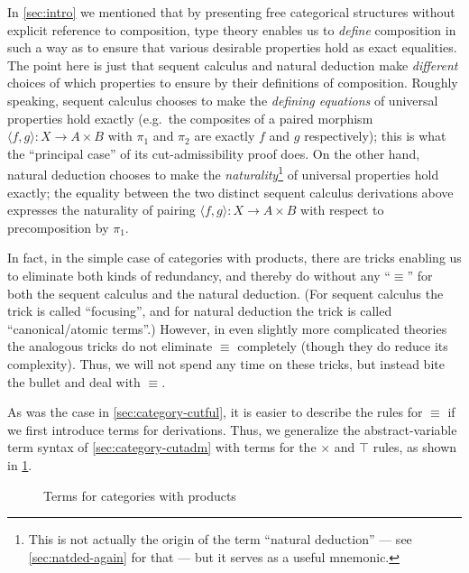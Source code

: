 \documentclass{book}
\def\idfunc{\mathsf{id}}
\let\types\vdash
\def\type{\;\ftype}
\def\unit{\top}%
\def\ttt{\mathord{\ast}}%
\def\timesE{\ensuremath{\mathord{\times}E}}
\def\timesI{\ensuremath{\mathord{\times}I}}
\def\pair#1#2{\langle #1,#2\rangle}
\def\pr#1#2#3{\pi_{#1}^{#2,#3}}
\begin{document}
\begin{rmk}
  In \cref{sec:intro} we mentioned that by presenting free categorical structures without explicit reference to composition, type theory enables us to \emph{define} composition in such a way as to ensure that various desirable properties hold as exact equalities.
  The point here is just that sequent calculus and natural deduction make \emph{different} choices of which properties to ensure by their definitions of composition.
  Roughly speaking, sequent calculus chooses to make the \emph{defining equations} of universal properties hold exactly (e.g.\ the composites of a paired morphism $\pair f g : X \to A\times B$ with $\pi_1$ and $\pi_2$ are exactly $f$ and $g$ respectively); this is what the ``principal case'' of its cut-admissibility proof does.
  On the other hand, natural deduction chooses to make the \emph{naturality}\footnote{This is not actually the origin of the term ``natural deduction'' --- see \cref{sec:natded-again} for that --- but it serves as a useful mnemonic.} of universal properties hold exactly; the equality between the two distinct sequent calculus derivations above expresses the naturality of pairing $\pair f g : X \to A\times B$ with respect to precomposition by $\pi_1$.
\end{rmk}

In fact, in the simple case of categories with products, there are tricks enabling us to eliminate {both} kinds of redundancy, and thereby do without any ``$\equiv$'' for both the sequent calculus and the natural deduction.
(For sequent calculus the trick is called ``focusing'', and for natural deduction the trick is called ``canonical/atomic terms''.)
However, in even slightly more complicated theories the analogous tricks do not eliminate $\equiv$ completely (though they do reduce its complexity).
Thus, we will not spend any time on these tricks, but instead bite the bullet and deal with $\equiv$.

As was the case in \cref{sec:category-cutful}, it is easier to describe the rules for $\equiv$ if we first introduce terms for derivations.
Thus, we generalize the abstract-variable term syntax of \cref{sec:category-cutadm} with terms for the $\times$ and $\unit$ rules, as shown in \cref{fig:catprod-terms}.

\begin{figure}
  \centering
  \caption{Terms for categories with products}
  \label{fig:catprod-terms}
\end{figure}
\end{document}
